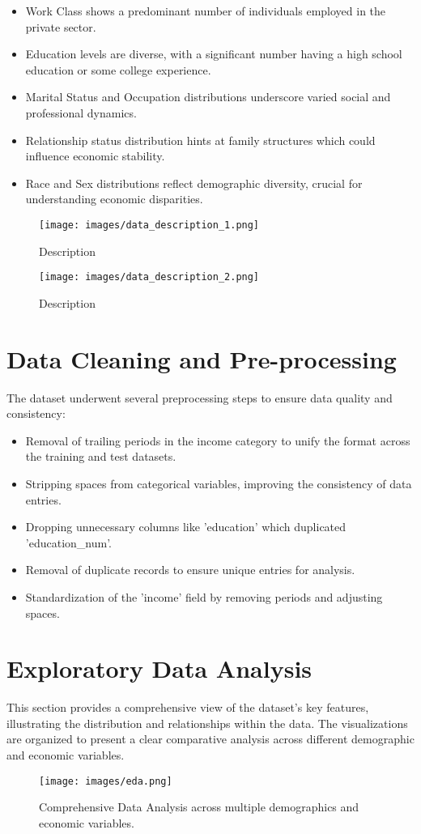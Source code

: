 \documentclass[12pt]{article}
\begin{document}
\begin{itemize}
    \item Work Class shows a predominant number of individuals employed in the private sector.
    \item Education levels are diverse, with a significant number having a high school education or some college experience.
    \item Marital Status and Occupation distributions underscore varied social and professional dynamics.
    \item Relationship status distribution hints at family structures which could influence economic stability.
    \item Race and Sex distributions reflect demographic diversity, crucial for understanding economic disparities.
\end{itemize}
 \begin{figure}[H]
    \centering
    \texttt{[image: images/data\_description\_1.png]}
    \caption{Description}
\end{figure}
\begin{figure}[H]
    \centering
    \texttt{[image: images/data\_description\_2.png]}
    \caption{Description}
\end{figure}

\section{Data Cleaning and Pre-processing}
The dataset underwent several preprocessing steps to ensure data quality and consistency:
\begin{itemize}
    \item Removal of trailing periods in the income category to unify the format across the training and test datasets.
    \item Stripping spaces from categorical variables, improving the consistency of data entries.
    \item Dropping unnecessary columns like 'education' which duplicated 'education\_num'.
    \item Removal of duplicate records to ensure unique entries for analysis.
    \item Standardization of the 'income' field by removing periods and adjusting spaces.
\end{itemize}

\section{Exploratory Data Analysis}
This section provides a comprehensive view of the dataset's key features, illustrating the distribution and relationships within the data. The visualizations are organized to present a clear comparative analysis across different demographic and economic variables.
\begin{figure}[H]
    \centering
    \texttt{[image: images/eda.png]}
    \caption{Comprehensive Data Analysis across multiple demographics and economic variables.}
\end{figure}
\end{document}
